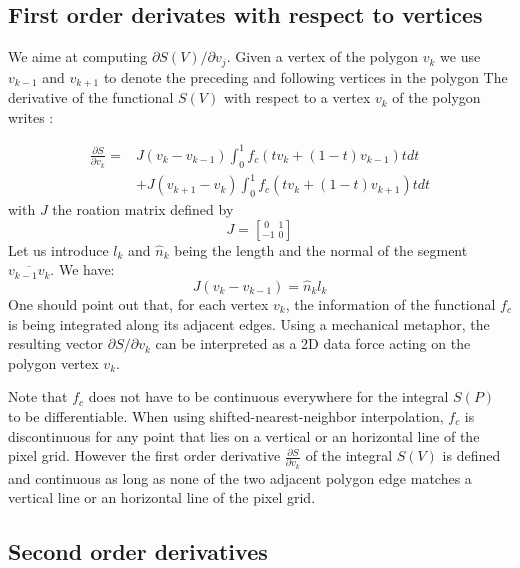 \documentclass[11pt]{article}
\begin{document}
       
\subsection{First order derivates with respect to vertices}

\label{sec:silhouette_forces}

We aime at computing ${\partial S(V)}/{\partial v_j}$. Given a vertex of the polygon $v_k$ we use $v_{k-1}$ and $v_{k+1}$ to denote the preceding and following vertices in the polygon
The derivative of the functional $S(V)$ with respect to a vertex $v_k$ of the polygon writes :
        
\begin{equation}
\begin{split}
\frac{\partial S}{\partial v_k}=&J(v_k-v_{k-1})\int_0^1 f_c(tv_k+(1-t)v_{k-1})tdt\\
&+J(v_{k+1}-v_{k})\int_0^1 f_c(tv_{k}+(1-t)v_{k+1})tdt
\end{split}
\label{eqn:active_polygon}
\end{equation}
with $J$ the roation matrix defined by $$J=\left[^{~0}_{-1}~^{1}_{0}\right]$$
Let us introduce $l_k$ and $\hat{n}_k$ being the length and the normal of the segment $\overline{v_{k-1}v_k} $. We have: 
\begin{equation}
J(v_k-v_{k-1})=\hat{n}_k l_k
\end{equation}
One should point out that, for each vertex $v_k$, the information of the functional $f_c$ is being integrated along its adjacent edges. Using a mechanical metaphor, the resulting vector ${\partial S}/{\partial v_k}$ can be interpreted as a 2D data force acting on the polygon vertex $v_k$. 




 
 Note that $f_c$ does not have to be continuous everywhere for the integral  $S(P)$ to be differentiable. When using shifted-nearest-neighbor interpolation, $f_c$ is discontinuous for any point that lies on a vertical or an horizontal line of the pixel grid. However the first order derivative $\frac{\partial S}{\partial v_k}$ of the integral $S(V)$ is defined and continuous as long as none of the two adjacent polygon edge matches a vertical line or an horizontal line of the pixel grid.
 
 







\subsection{Second order derivatives}
\label{sec:second_order_derivatives}
\end{document}
